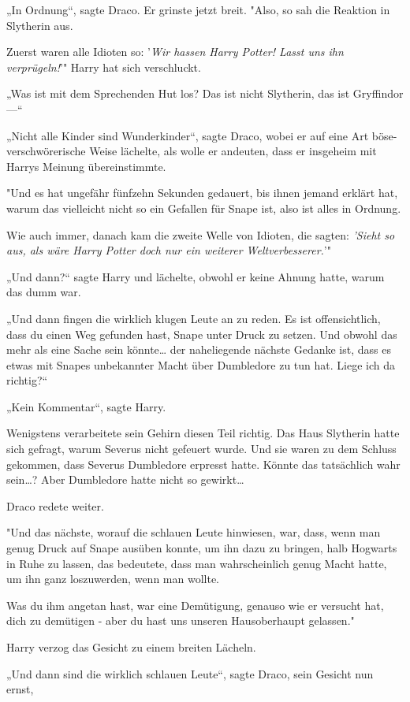 {„In Ordnung“, sagte Draco. Er grinste jetzt breit. "Also, so sah die Reaktion in Slytherin aus.

Zuerst waren alle Idioten so: '\emph{Wir hassen Harry Potter! Lasst uns ihn verprügeln!}'" Harry hat sich verschluckt.

„Was ist mit dem Sprechenden Hut los? Das ist nicht Slytherin, das ist Gryffindor—“

„Nicht alle Kinder sind Wunderkinder“, sagte Draco, wobei er auf eine Art böse-verschwörerische Weise lächelte, als wolle er andeuten, dass er insgeheim mit Harrys Meinung übereinstimmte.

"Und es hat ungefähr fünfzehn Sekunden gedauert, bis ihnen jemand erklärt hat, warum das vielleicht nicht so ein Gefallen für Snape ist, also ist alles in Ordnung.

Wie auch immer, danach kam die zweite Welle von Idioten, die sagten: \emph{'Sieht so aus, als wäre Harry Potter doch nur ein weiterer Weltverbesserer.}'"

„Und dann?“ sagte Harry und lächelte, obwohl er keine Ahnung hatte, warum das dumm war.

„Und dann fingen die wirklich klugen Leute an zu reden. Es ist offensichtlich, dass du einen Weg gefunden hast, Snape unter Druck zu setzen. Und obwohl das mehr als eine Sache sein könnte… der naheliegende nächste Gedanke ist, dass es etwas mit Snapes unbekannter Macht über Dumbledore zu tun hat. Liege ich da richtig?“

„Kein Kommentar“, sagte Harry.

Wenigstens verarbeitete sein Gehirn diesen Teil richtig. Das Haus Slytherin hatte sich gefragt, warum Severus nicht gefeuert wurde. Und sie waren zu dem Schluss gekommen, dass Severus Dumbledore erpresst hatte. Könnte das tatsächlich wahr sein…? Aber Dumbledore hatte nicht so gewirkt…

Draco redete weiter.

"Und das nächste, worauf die schlauen Leute hinwiesen, war, dass, wenn man genug Druck auf Snape ausüben konnte, um ihn dazu zu bringen, halb Hogwarts in Ruhe zu lassen, das bedeutete, dass man wahrscheinlich genug Macht hatte, um ihn ganz loszuwerden, wenn man wollte.

Was du ihm angetan hast, war eine Demütigung, genauso wie er versucht hat, dich zu demütigen - aber du hast uns unseren Hausoberhaupt gelassen."

Harry verzog das Gesicht zu einem breiten Lächeln.

„Und dann sind die wirklich schlauen Leute“, sagte Draco, sein Gesicht nun ernst,

}
